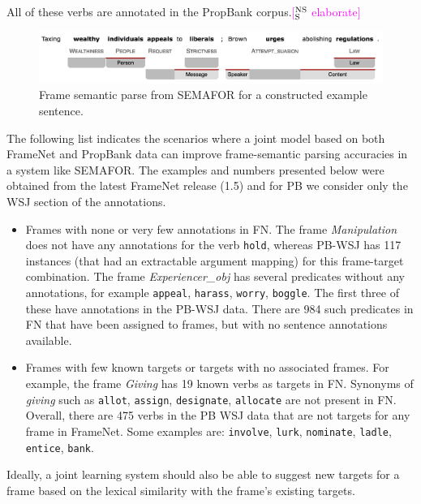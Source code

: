 \documentclass[11pt]{article}
\newcommand{\ensuretext}[1]{#1}
\newcommand{\nssmarker}{\ensuretext{\textcolor{magenta}{\ensuremath{^{\textsc{NS}}_{\textsc{S}}}}}}
\newcommand{\arkcomment}[3]{\ensuretext{\textcolor{#3}{[#1 #2]}}}
\newcommand{\nss}[1]{\arkcomment{\nssmarker}{#1}{magenta}}
\begin{document}
All of these verbs are annotated in the PropBank corpus.\nss{elaborate}

\begin{figure}
\includegraphics[width=\textwidth]{tax_example_short.jpg}
\caption{Frame semantic parse from SEMAFOR for a constructed example sentence.}
\label{fig:semaforOutput}
\end{figure}


The following list indicates the scenarios where a joint model based on both FrameNet and PropBank data can improve frame-semantic parsing accuracies in a system like SEMAFOR. The examples and numbers presented below were obtained from the latest FrameNet release (1.5) and for PB we consider only the WSJ section of the annotations.
\begin{itemize}
\item Frames with none or very few annotations in FN. The frame \textit{Manipulation} does not have any annotations for the verb \texttt{hold}, whereas PB-WSJ has 117 instances (that had an extractable argument mapping) for this frame-target combination. The frame \textit{Experiencer\_obj} has several predicates without any annotations, for example \texttt{appeal}, \texttt{harass}, \texttt{worry}, \texttt{boggle}. The first three of these have annotations in the PB-WSJ data. There are 984 such predicates in FN that have been assigned to frames, but with no sentence annotations available.
\item Frames with few known targets or targets with no associated frames. For example, the frame \textit{Giving} has 19 known verbs as targets in FN. Synonyms of \textit{giving} such as \texttt{allot}, \texttt{assign}, \texttt{designate}, \texttt{allocate} are not present in FN. Overall, there are 475 verbs in the PB WSJ data that are not targets for any frame in FrameNet. Some examples are: \texttt{involve}, \texttt{lurk}, \texttt{nominate}, \texttt{ladle}, \texttt{entice}, \texttt{bank}.
\end{itemize}
Ideally, a joint learning system should also be able to suggest new targets for a frame based on the lexical similarity with the frame's existing targets.
\end{document}
